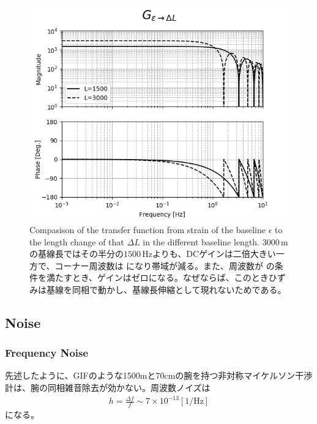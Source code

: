 \begin{figure}[p]
  \begin{center}
    \includegraphics[width=13.0cm]{./img_chap4/img412.png}
    \caption{Compasison of the transfer function from strain of the baseline $\epsilon$ to the length change of that $\Delta{L}$ in the different baseline length. $3000\,\mathrm{m}$ の基線長ではその半分の$1500\,\mathrm{Hz}$よりも、DCゲインは二倍大きい一方で、コーナー周波数は \color{red}{A} になり帯域が減る。また、周波数が \color{red}{B} の条件を満たすとき、ゲインはゼロになる。なぜならば、このときひずみは基線を同相で動かし、基線長伸縮として現れないためである。}\label{img:img411_a}
  \end{center}
\end{figure}

\subsection{Noise}
\subsubsection{Frequency Noise}
先述したように、GIFのような1500mと70cmの腕を持つ非対称マイケルソン干渉計は、腕の同相雑音除去が効かない。周波数ノイズは
\begin{eqnarray}
  h = \frac{\Delta{f}}{f} \sim 7\times10^{-13} [\mathrm{1/\mathrm{Hz}}]
\end{eqnarray}
になる\cite{araya2017design}。

